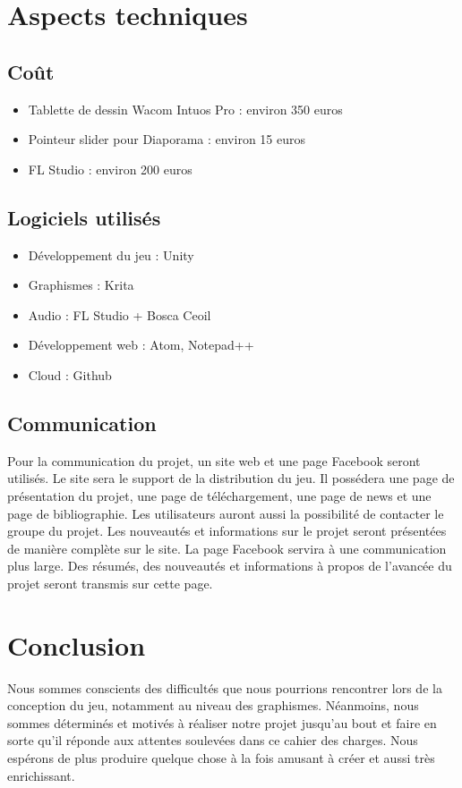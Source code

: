 \documentclass[]{extarticle}
\begin{document}
\section{Aspects techniques}
	\subsection{Coût}
\bigbreak
\bigbreak
\begin{itemize}
\item Tablette de dessin Wacom Intuos Pro : environ 350 euros
\item Pointeur slider pour Diaporama : environ 15 euros
\item FL Studio : environ 200 euros
\end{itemize}

\bigbreak
	\subsection{Logiciels utilisés}
\bigbreak
\bigbreak
\begin{itemize}
\item Développement du jeu : Unity
\item Graphismes : Krita
\item Audio : FL Studio + Bosca Ceoil
\item Développement web : Atom, Notepad++
\item Cloud : Github
\end{itemize}
\bigbreak
\bigbreak
\bigbreak
	\subsection{Communication}
\bigbreak
\bigbreak
Pour la communication du projet, un site web et une page Facebook seront utilisés.
\bigbreak
Le site sera le support de la distribution du jeu. Il possédera une page de présentation du projet, une page de téléchargement, une page de news et une page de bibliographie. Les utilisateurs auront aussi la possibilité de contacter le groupe du projet. Les nouveautés et informations sur le projet seront présentées de manière complète sur le site.
\bigbreak
La page Facebook servira à une communication plus large. Des résumés, des nouveautés et informations à propos de l’avancée du projet seront transmis sur cette page.
\bigbreak

\section{Conclusion}
\bigbreak
\bigbreak
Nous sommes conscients des difficultés que nous pourrions rencontrer lors de la conception du jeu, notamment au niveau des graphismes. Néanmoins, nous sommes déterminés et motivés à réaliser notre projet jusqu'au bout et faire en sorte qu'il réponde aux attentes soulevées dans ce cahier des charges. Nous espérons de plus produire quelque chose à la fois amusant à créer et aussi très enrichissant.
\end{document}
